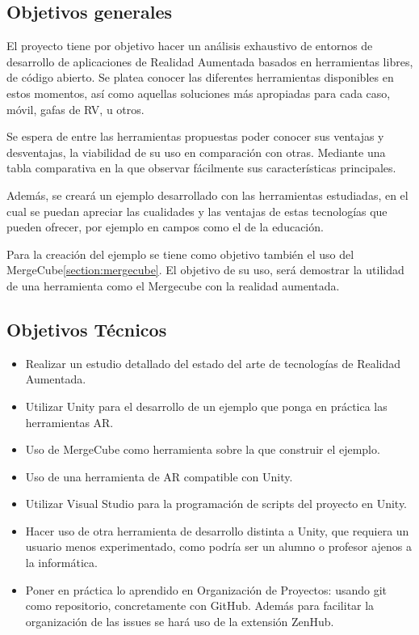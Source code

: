 
\subsection{Objetivos generales}
El proyecto tiene por objetivo hacer un análisis exhaustivo de entornos de desarrollo de aplicaciones de Realidad Aumentada basados en herramientas libres, de código abierto. Se platea conocer las diferentes herramientas disponibles en estos momentos, así como aquellas soluciones más apropiadas para cada caso, móvil, gafas de RV, u otros.

Se espera de entre las herramientas propuestas poder conocer sus ventajas y desventajas, la viabilidad de su uso en comparación con otras. Mediante una tabla comparativa en la que observar fácilmente sus características principales.

Además, se creará un ejemplo desarrollado con las herramientas estudiadas, en el cual se puedan apreciar las cualidades y las ventajas de estas tecnologías que pueden ofrecer, por ejemplo en campos como el de la educación.

Para la creación del ejemplo se tiene como objetivo también el uso del MergeCube\ref{section:mergecube}. El objetivo de su uso, será demostrar la utilidad de una herramienta como el Mergecube con la realidad aumentada.

 

\subsection{Objetivos Técnicos}
\begin{itemize}
\item Realizar un estudio detallado del estado del arte de tecnologías de Realidad Aumentada. 	
\item Utilizar Unity para el desarrollo de un ejemplo que ponga en práctica las herramientas AR.
\item Uso de MergeCube como herramienta sobre la que construir el ejemplo.
\item Uso de una herramienta de AR compatible con Unity.
\item Utilizar Visual Studio para la programación de scripts del proyecto en Unity.
\item Hacer uso de otra herramienta de desarrollo distinta a Unity, que requiera un usuario menos experimentado, como podría ser un alumno o profesor ajenos a la informática.
\item Poner en práctica lo aprendido en Organización de Proyectos: usando git como repositorio, concretamente con GitHub. Además para facilitar la organización de las issues  se hará uso de la extensión ZenHub.

	
\end{itemize}

